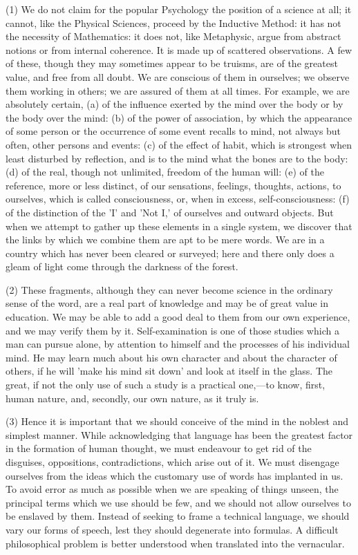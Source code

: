 \documentclass[11pt,letter]{article}
\begin{document}
\par  (1) We do not claim for the popular Psychology the position of a science at all; it cannot, like the Physical Sciences, proceed by the Inductive Method: it has not the necessity of Mathematics: it does not, like Metaphysic, argue from abstract notions or from internal coherence. It is made up of scattered observations. A few of these, though they may sometimes appear to be truisms, are of the greatest value, and free from all doubt. We are conscious of them in ourselves; we observe them working in others; we are assured of them at all times. For example, we are absolutely certain, (a) of the influence exerted by the mind over the body or by the body over the mind: (b) of the power of association, by which the appearance of some person or the occurrence of some event recalls to mind, not always but often, other persons and events: (c) of the effect of habit, which is strongest when least disturbed by reflection, and is to the mind what the bones are to the body: (d) of the real, though not unlimited, freedom of the human will: (e) of the reference, more or less distinct, of our sensations, feelings, thoughts, actions, to ourselves, which is called consciousness, or, when in excess, self-consciousness: (f) of the distinction of the 'I' and 'Not I,' of ourselves and outward objects. But when we attempt to gather up these elements in a single system, we discover that the links by which we combine them are apt to be mere words. We are in a country which has never been cleared or surveyed; here and there only does a gleam of light come through the darkness of the forest.

\par  (2) These fragments, although they can never become science in the ordinary sense of the word, are a real part of knowledge and may be of great value in education. We may be able to add a good deal to them from our own experience, and we may verify them by it. Self-examination is one of those studies which a man can pursue alone, by attention to himself and the processes of his individual mind. He may learn much about his own character and about the character of others, if he will 'make his mind sit down' and look at itself in the glass. The great, if not the only use of such a study is a practical one,—to know, first, human nature, and, secondly, our own nature, as it truly is.

\par  (3) Hence it is important that we should conceive of the mind in the noblest and simplest manner. While acknowledging that language has been the greatest factor in the formation of human thought, we must endeavour to get rid of the disguises, oppositions, contradictions, which arise out of it. We must disengage ourselves from the ideas which the customary use of words has implanted in us. To avoid error as much as possible when we are speaking of things unseen, the principal terms which we use should be few, and we should not allow ourselves to be enslaved by them. Instead of seeking to frame a technical language, we should vary our forms of speech, lest they should degenerate into formulas. A difficult philosophical problem is better understood when translated into the vernacular.
\end{document}
